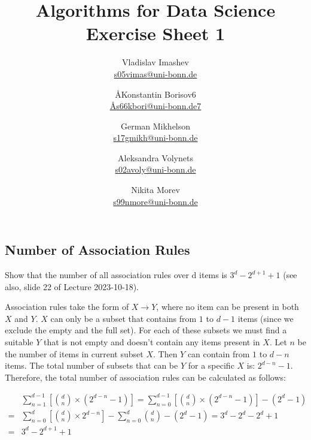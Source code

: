 \documentclass{article}
\title{Algorithms for Data Science \\ Exercise Sheet 1}
\author{
  Vladislav Imashev \\ \href{mailto:s05vimas@uni-bonn.de}{s05vimas@uni-bonn.de} \and
  \AA{Konstantin Borisov}{6} \\ \href{mailto:\AA{s66kbori@uni-bonn.de}{7}}{\AA{s66kbori@uni-bonn.de}{7}} \and
  German Mikhelson \\ \href{mailto:s17gmikh@uni-bonn.de}{s17gmikh@uni-bonn.de} \and
  Aleksandra Volynets \\ \href{mailto:s02avoly@uni-bonn.de}{s02avoly@uni-bonn.de} \and
  Nikita Morev \\ \href{mailto:s99nmore@uni-bonn.de}{s99nmore@uni-bonn.de}
}
\begin{document}
  \maketitle

  \setcounter{section}{1}
  \subsection{Number of Association Rules}
  \begin{centerframebox}
    Show that the number of all association rules over d items is $3^d - 2^{d+1} + 1$
    (see also, slide 22 of Lecture 2023-10-18).
  \end{centerframebox}
  Association rules take the form of $X \to Y$, where no item can be present in both $X$ and $Y$. $X$ can only be a subset that contains from $1$ to $d-1$ items (since we exclude the empty and the full set).
  For each of these subsets we must find a suitable $Y$ that is not empty and doesn't contain any items present in $X$.
  Let $n$ be the number of items in current subset $X$. Then $Y$ can contain from $1$ to $d-n$ items.
  The total number of subsets that can be $Y$ for a specific $X$ is: $2^{d-n} - 1$.
  Therefore, the total number of association rules can be calculated as follows:

  \begin{align*}
    &\sum_{n=1}^{d-1} {\left[\binom {d} {n}  \times \left({2} ^ {d-n} -1 \right) \right] = \sum_{n=0}^{d-1} {\left[\binom {d} {n} \times ( {2} ^ {d-n} -1) \right] - \left({2} ^ {d} -1 \right)}}  \\
    =& \sum_{n=0}^{d} {\left[\binom {d} {n} \times {2} ^ {d-n} \right] - \sum_{n=0}^{d} {\binom {d} {n} -} \left({2} ^ {d} -1 \right)} = {3} ^ {d} - {2} ^ {d} - {2} ^ {d} +1  \\
    =& {3} ^ {d} - {2} ^ {d +1} +1 \\
  \end{align*}
\end{document}
